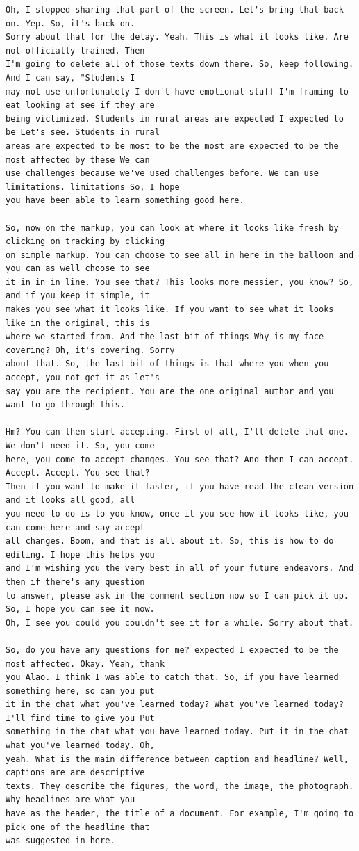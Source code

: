 {\begin{Verbatim}
Oh, I stopped sharing that part of the screen. Let's bring that back on. Yep. So, it's back on.
Sorry about that for the delay. Yeah. This is what it looks like. Are not officially trained. Then
I'm going to delete all of those texts down there. So, keep following. And I can say, "Students I
may not use unfortunately I don't have emotional stuff I'm framing to eat looking at see if they are
being victimized. Students in rural areas are expected I expected to be Let's see. Students in rural
areas are expected to be most to be the most are expected to be the most affected by these We can
use challenges because we've used challenges before. We can use limitations. limitations So, I hope
you have been able to learn something good here.

So, now on the markup, you can look at where it looks like fresh by clicking on tracking by clicking
on simple markup. You can choose to see all in here in the balloon and you can as well choose to see
it in in in line. You see that? This looks more messier, you know? So, and if you keep it simple, it
makes you see what it looks like. If you want to see what it looks like in the original, this is
where we started from. And the last bit of things Why is my face covering? Oh, it's covering. Sorry
about that. So, the last bit of things is that where you when you accept, you not get it as let's
say you are the recipient. You are the one original author and you want to go through this.

Hm? You can then start accepting. First of all, I'll delete that one. We don't need it. So, you come
here, you come to accept changes. You see that? And then I can accept. Accept. Accept. You see that?
Then if you want to make it faster, if you have read the clean version and it looks all good, all
you need to do is to you know, once it you see how it looks like, you can come here and say accept
all changes. Boom, and that is all about it. So, this is how to do editing. I hope this helps you
and I'm wishing you the very best in all of your future endeavors. And then if there's any question
to answer, please ask in the comment section now so I can pick it up. So, I hope you can see it now.
Oh, I see you could you couldn't see it for a while. Sorry about that.

So, do you have any questions for me? expected I expected to be the most affected. Okay. Yeah, thank
you Alao. I think I was able to catch that. So, if you have learned something here, so can you put
it in the chat what you've learned today? What you've learned today? I'll find time to give you Put
something in the chat what you have learned today. Put it in the chat what you've learned today. Oh,
yeah. What is the main difference between caption and headline? Well, captions are are descriptive
texts. They describe the figures, the word, the image, the photograph. Why headlines are what you
have as the header, the title of a document. For example, I'm going to pick one of the headline that
was suggested in here.


\end{Verbatim}}
